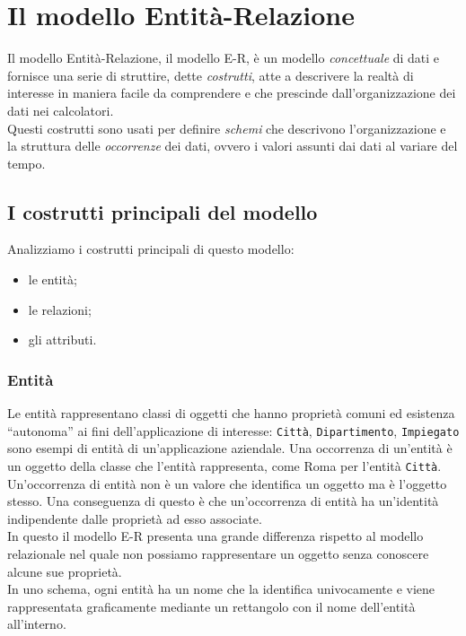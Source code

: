 \documentclass[12pt]{report}
\begin{document}
 	\chapter{Il modello Entità-Relazione}
 	Il modello Entità-Relazione, il modello E-R, è un modello \textit{concettuale} di dati e fornisce una serie di struttire, dette \textit{costrutti}, atte a descrivere la realtà di interesse in maniera facile da comprendere e che prescinde dall'organizzazione dei dati nei calcolatori. \\
 	Questi costrutti sono usati per definire \textit{schemi} che descrivono l'organizzazione e la struttura delle \textit{occorrenze} dei dati, ovvero i valori assunti dai dati al variare del tempo.
 	\section{I costrutti principali del modello}
 	Analizziamo i costrutti principali di questo modello:
 	\begin{itemize}
 		\item le entità;
 		\item le relazioni;
 		\item gli attributi.
 	\end{itemize}
 	\subsection{Entità} Le entità rappresentano classi di oggetti che hanno proprietà comuni ed esistenza ``autonoma'' ai fini dell'applicazione di interesse: \texttt{Città}, \texttt{Dipartimento}, \texttt{Impiegato} sono esempi di entità di un'applicazione aziendale. Una occorrenza di un'entità è un oggetto della classe che l'entità rappresenta, come Roma per l'entità \texttt{Città}. Un'occorrenza di entità non è un valore che identifica un oggetto ma è l'oggetto stesso. Una conseguenza di questo è che un'occorrenza di entità ha un'identità indipendente dalle proprietà ad esso associate. \\
 	In questo il modello E-R presenta una grande differenza rispetto al modello relazionale nel quale non possiamo rappresentare un oggetto senza conoscere alcune sue proprietà. \\
 	In uno schema, ogni entità ha un nome che la identifica univocamente e viene rappresentata graficamente mediante un rettangolo con il nome dell'entità all'interno.
\end{document}
